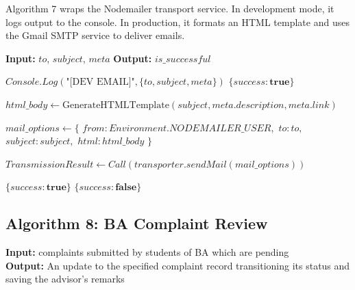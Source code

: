 Algorithm 7 wraps the Nodemailer transport service. In development mode, it logs output to the console. In production, it formats an HTML template and uses the Gmail SMTP service to deliver emails.

\begin{algorithm}[htbp]
\caption{System Email Dispatch Process}
\begin{algorithmic}[1]

\State \textbf{Input:} $to$, $subject$, $meta$
\State \textbf{Output:} $is\_successful$


    \State {}
        \State $Console.Log(\text{"[DEV EMAIL]"}, \{to, subject, meta\})$
        \State \Return $\{ success: \textbf{true} \}$
    \EndIf

    \State {}
    \State $html\_body \gets \text{GenerateHTMLTemplate}(subject, meta.description, meta.link)$

    \State $mail\_options \gets \{$
    \State \quad $from: Environment.NODEMAILER\_USER,$
    \State \quad $to: to,$
    \State \quad $subject: subject,$
    \State \quad $html: html\_body$
    \State $\}$

    \State {}
    \State $TransmissionResult \gets Call(transporter.sendMail(mail\_options))$

        \State \Return $\{ success: \textbf{true} \}$
    \Else
        \State {}
        \State \Return $\{ success: \textbf{false} \}$
    \EndIf

\EndFunction

\end{algorithmic}
\end{algorithm}


\subsection{Algorithm 8: BA Complaint Review}

\textbf{Input:} complaints submitted by students of BA which are pending \\
\textbf{Output:} An update to the specified complaint record transitioning its status and saving the advisor's remarks \\

